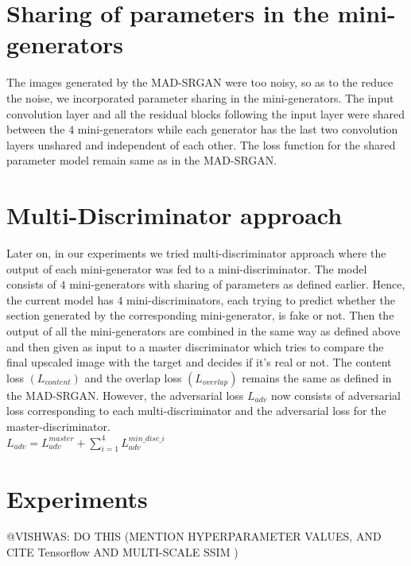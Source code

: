 \documentclass[12pt,a4paper,twocolumn]{article}
\begin{document}
    \section{Sharing of parameters in the mini-generators}
    The images generated by the MAD-SRGAN were too noisy, so as to the reduce the noise, we incorporated parameter sharing in the mini-generators. The input convolution layer and all the residual blocks following the input layer were shared between the $4$ mini-generators while each generator has the last two convolution layers unshared and independent of each other. The loss function for the shared parameter model remain same as in the MAD-SRGAN.

    \section{Multi-Discriminator approach}
     Later on, in our experiments we tried multi-discriminator approach where the output of each mini-generator was fed to a mini-discriminator. The model consists of $4$ mini-generators with sharing of parameters as defined earlier. Hence, the current model has $4$ mini-discriminators, each trying to predict whether the section generated by the corresponding mini-generator, is fake or not. Then the output of all the mini-generators are combined in the same way as defined above and then given as input to a master discriminator which tries to compare the final upscaled image with the target and decides if it's real or not. The content loss $(L_{content})$ and the overlap loss $(L_{overlap})$ remains the same as defined in the MAD-SRGAN. However, the adversarial loss $L_{adv}$ now  consists of adversarial loss corresponding to each multi-discriminator and the adversarial loss for the master-discriminator.\\
        $L_{adv} = L_{adv}^{master} + \sum_{i=1}^{4}L_{adv}^{min\_disc\_i}$

    \section{Experiments}
        @VISHWAS: DO THIS (MENTION HYPERPARAMETER VALUES, AND CITE Tensorflow \cite{tensorflow} AND MULTI-SCALE SSIM \cite{msssim})
\end{document}
